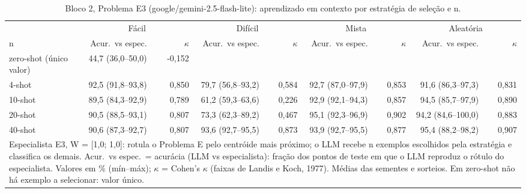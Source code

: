 \begin{table}[htbp]
\centering
\small
\caption{Bloco 2, Problema E3 (google/gemini-2.5-flash-lite): aprendizado em contexto por estratégia de seleção e n.}
\label{tab:bloco2_E3_faseE_estrategia_x_nshot_flashlite}
\begin{tabular}{lrrrrrrrr}
\toprule
 & \multicolumn{2}{c}{Fácil} & \multicolumn{2}{c}{Difícil} & \multicolumn{2}{c}{Mista} & \multicolumn{2}{c}{Aleatória} \\ \cmidrule(lr){2-3} \cmidrule(lr){4-5} \cmidrule(lr){6-7} \cmidrule(lr){8-9}
n & Acur.\ vs espec. & $\kappa$ & Acur.\ vs espec. & $\kappa$ & Acur.\ vs espec. & $\kappa$ & Acur.\ vs espec. & $\kappa$ \\
\midrule
zero-shot (único valor) & 44,7 (36,0–50,0) & -0,152 &  &  &  &  &  &  \\
4-shot & 92,5 (91,8–93,8) & 0,850 & 79,7 (56,8–93,2) & 0,584 & 92,7 (87,0–97,9) & 0,853 & 91,6 (86,3–97,3) & 0,831 \\
10-shot & 89,5 (84,3–92,9) & 0,789 & 61,2 (59,3–63,6) & 0,226 & 92,9 (92,1–94,3) & 0,857 & 94,5 (85,7–97,9) & 0,890 \\
20-shot & 90,5 (88,5–93,1) & 0,807 & 73,3 (62,3–89,2) & 0,467 & 95,1 (92,3–96,9) & 0,902 & 94,2 (84,6–100,0) & 0,883 \\
40-shot & 90,6 (87,3–92,7) & 0,807 & 93,6 (92,7–95,5) & 0,873 & 93,9 (92,7–95,5) & 0,877 & 95,4 (88,2–98,2) & 0,907 \\
\bottomrule
\multicolumn{9}{p{0.95\linewidth}}{\footnotesize Especialista E3, W = [1,0; 1,0]: rotula o Problema E pelo centróide mais próximo; o LLM recebe n exemplos escolhidos pela estratégia e classifica os demais. Acur.\ vs espec.\ = acurácia (LLM vs especialista): fração dos pontos de teste em que o LLM reproduz o rótulo do especialista. Valores em \% (mín–máx); $\kappa$ = Cohen's $\kappa$ (faixas de Landis e Koch, 1977). Médias das sementes e sorteios. Em zero-shot não há exemplo a selecionar: valor único.} \\
\end{tabular}
\end{table}
